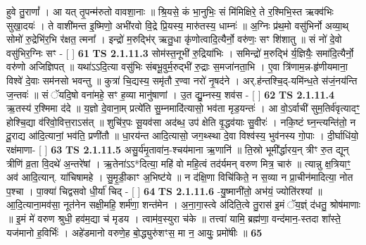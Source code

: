 \documentclass[17pt]{extarticle}
\begin{document}
                  हुवे तु॒राणां᳚ । आ यत् तृ॒पन्म॑रुतो वावशा॒नाः ॥ श्रि॒यसे॒ कं भा॒नुभिः॒ सं मि॑मिक्षिरे॒ ते र॒श्मिभि॒स्त ऋक्व॑भिः सुखा॒दयः॑ । ते वाशी॑मन्त इ॒ष्मिणो॒ अभी॑रवो वि॒द्रे प्रि॒यस्य॒ मारु॑तस्य॒ धाम्नः॑ ॥ अ॒ग्निः प्र॑थ॒मो वसु॑भिर्नो अव्या॒थ् सोमो॑ रु॒द्रेभि॑र॒भि र॑क्षत॒ त्मना᳚ । इन्द्रो॑ म॒रुद्भि॑र् ऋतु॒धा कृ॑णोत्वादि॒त्यैर्नो॒ वरु॑णः॒ सꣳ शि॑शातु ॥ सं नो॑ दे॒वो वसु॑भिर॒ग्निः सꣳ - [  ] \textbf{  61} \newline
                  \newline
                                \textbf{ TS 2.1.11.3} \newline
                  सोम॑स्त॒नूभी॑ रु॒द्रिया॑भिः । समिन्द्रो॑ म॒रुद्भि॑ र्य॒ज्ञियैः॒ समा॑दि॒त्यैर्नो॒ वरु॑णो अजिज्ञिपत् ॥ यथा॑ऽऽदि॒त्या वसु॑भिः संबभू॒वुर्म॒रुद्भी॑ रु॒द्राः स॒मजा॑नता॒भि । ए॒वा त्रि॑णाम॒न्न-हृ॑णीयमाना॒ विश्वे॑ दे॒वाः सम॑नसो भवन्तु ॥ कुत्रा॑ चि॒द्यस्य॒ समृ॑तौ र॒ण्वा नरो॑ नृ॒षद॑ने । अर्.ह॑न्तश्चि॒द्-यमि॑न्ध॒ते स॑जं॒नय॑न्ति ज॒न्तवः॑ ॥ सं ॅयदि॒षो वना॑महे॒ सꣳ ह॒व्या मानु॑षाणां । उ॒त द्यु॒म्नस्य॒ शव॑स - [  ] \textbf{  62} \newline
                  \newline
                                \textbf{ TS 2.1.11.4} \newline
                  ऋ॒तस्य॑ र॒श्मिमा द॑दे ॥ य॒ज्ञो दे॒वाना॒म् प्रत्ये॑ति सु॒म्नमादि॑त्यासो॒ भव॑ता मृड॒यन्तः॑ । आ वो॒ऽर्वाची॑ सुम॒तिर्व॑वृत्यादꣳ॒॒ होश्चि॒द्या व॑रिवो॒वित्त॒राऽस॑त् ॥ शुचि॑र॒पः सू॒यव॑सा अद॑ब्ध॒ उप॑ क्षेति वृ॒द्धव॑याः सु॒वीरः॑ । नकि॒ष्टं घ्न॒न्त्यन्ति॑तो॒ न दू॒राद्य आ॑दि॒त्यानां॒ भव॑ति॒ प्रणी॑तौ ॥ धा॒रय॑न्त आदि॒त्यासो॒ जग॒थ्स्था दे॒वा विश्व॑स्य॒ भुव॑नस्य गो॒पाः । दी॒र्घाधि॑यो॒ रक्ष॑माणा-  [  ] \textbf{  63} \newline
                  \newline
                                \textbf{ TS 2.1.11.5} \newline
                  असु॒र्य॑मृ॒तावा॑न॒-श्चय॑माना ऋ॒णानि॑ ॥ ति॒स्रो भूमी᳚र्द्धारय॒न् त्रीꣳ रु॒त द्यून् त्रीणि॑ व्र॒ता वि॒दथे॑ अ॒न्तरे॑षां । ऋ॒तेना॑ऽऽ*दित्या॒ महि॑ वो महि॒त्वं तद॑र्यमन् वरुण मित्र॒ चारु॑ ॥ त्यान्नु क्ष॒त्रियाꣳ॒॒ अव॑ आदि॒त्यान्. या॑चिषामहे । सु॒मृ॒डी॒काꣳ अ॒भिष्ट॑ये ॥ न द॑क्षि॒णा विचि॑किते॒ न स॒व्या न प्रा॒चीन॑मादित्या॒ नोत प॒श्चा । पा॒क्या॑ चिद्वसवो धी॒र्या॑ चिद् - [  ] \textbf{  64} \newline
                  \newline
                                \textbf{ TS 2.1.11.6} \newline
                  -यु॒ष्मानी॑तो॒ अभ॑यं॒ ज्योति॑रश्यां ॥ आ॒दि॒त्याना॒मव॑सा॒ नूत॑नेन सक्षी॒महि॒ शर्म॑णा॒ शन्त॑मेन । अ॒ना॒गा॒स्त्वे अ॑दिति॒त्वे तु॒रास॑ इ॒मं ॅय॒ज्ञ्ं द॑धतु॒ श्रोष॑माणाः ॥ इ॒मं मे॑ वरुण श्रुधी॒ हव॑म॒द्या च॑ मृडय । त्वाम॑व॒स्युरा च॑के ॥ तत्त्वा॑ यामि॒ ब्रह्म॑णा॒ वन्द॑मान॒-स्तदा शा᳚स्ते॒ यज॑मानो ह॒विर्भिः॑ । अहे॑डमानो वरुणे॒ह बो॒द्ध्युरु॑शꣳस॒ मा न॒ आयुः॒ प्रमो॑षीः ॥ \textbf{  65 } \newline
\end{document}
